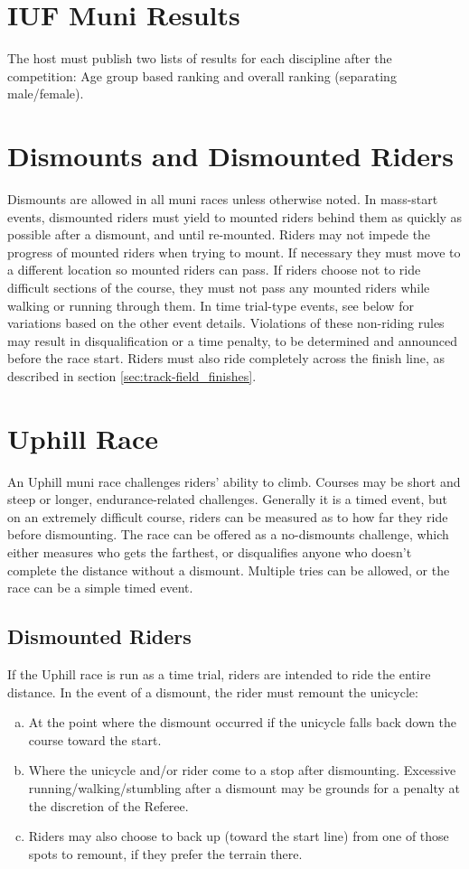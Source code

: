 \section{IUF Muni Results}
The host must publish two lists of results for each discipline after the competition: Age group based ranking and overall ranking (separating
male/female).

\section{Dismounts and Dismounted Riders}
Dismounts are allowed in all muni races unless otherwise noted.
In mass-start events, dismounted riders must yield to mounted riders behind them as quickly as possible after a dismount, and until re-mounted.
Riders may not impede the progress of mounted riders when trying to mount.
If necessary they must move to a different location so mounted riders can pass.
If riders choose not to ride difficult sections of the course, they must not pass any mounted riders while walking or running through them.
In time trial-type events, see below for variations based on the other event details.
Violations of these non-riding rules may result in disqualification or a time penalty, to be determined and announced before the race start.
Riders must also ride completely across the finish line, as described in section \ref{sec:track-field_finishes}.

\section{Uphill Race \label{sec:muni_uphill}}
An Uphill muni race challenges riders' ability to climb.
Courses may be short and steep or longer, endurance-related challenges.
Generally it is a timed event, but on an extremely difficult course, riders can be measured as to how far they ride before dismounting.
The race can be offered as a no-dismounts challenge, which either measures who gets the farthest, or disqualifies anyone who doesn't complete the distance without a dismount.
Multiple tries can be allowed, or the race can be a simple timed event.

\subsection{Dismounted Riders}
If the Uphill race is run as a time trial, riders are intended to ride the entire distance.
In the event of a dismount, the rider must remount the unicycle:
\begin{enumerate}[(a)]
\item At the point where the dismount occurred if the unicycle falls back down the course toward the start.
\item Where the unicycle and/or rider come to a stop after dismounting.
Excessive running/walking/stumbling after a dismount may be grounds for a
penalty at the discretion of the Referee.
\item Riders may also choose to back up (toward the start line) from one of those spots to remount, if they prefer the terrain there.
\end{enumerate}

